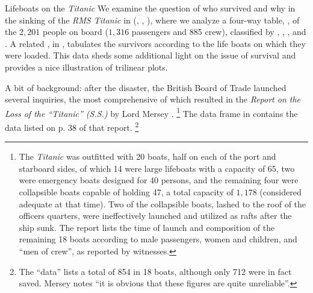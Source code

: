 \documentclass[10pt,krantz2]{krantz}\usepackage[]{graphicx}\usepackage[]{color}
\begin{document}
\begin{Example}[lifeboat1]{Lifeboats on the \emph{Titanic}}
We examine the question of who survived and why in the sinking of the \emph{RMS Titanic} in  (, , ),
where we analyze a four-way table, ,
of the $2,201$ people on board ($1,316$ passengers and 885 crew),
classified by , , , and .
A related \Dset,  in , tabulates
the survivors according to the life boats on which they were loaded.
This data sheds some additional light on the issue of survival and
provides a nice illustration of trilinear plots.

A bit of background: after the disaster, the British Board of Trade launched several
inquiries, the most comprehensive of which resulted in the
\emph{Report on the Loss of the ``Titanic'' (S.S.)}
by Lord Mersey
\citep{Mersey:1912}.%
\footnote{
The \emph{Titanic} was outfitted with 20 boats, half on each of the
port and starboard sides,
 of which 14 were large
lifeboats with a capacity of 65, two were emergency boats designed for
40 persons, and the remaining four were collapsible boats capable of holding
47, a total capacity of $1,178$ (considered adequate at that time).
Two of the collapsible boats, lashed to the roof of the officers
quarters, were ineffectively launched and utilized as rafts after the ship sunk.
The report lists the time of launch and composition of the remaining 18 boats according to male passengers, women and children, and ``men of crew'',
as reported by witnesses.
}
The  data frame   in 
contains the data listed on p. 38 of that report.%
\footnote{The ``data'' lists a total of 854 in 18 boats, although only
712 were in fact saved.  Mersey notes ``it is obvious that these figures
are quite unreliable''.
}


\end{Example}
\end{document}
